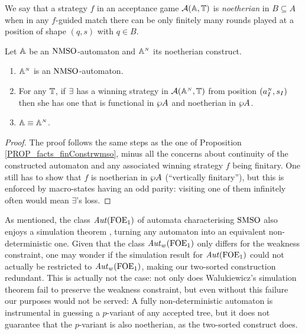 \begin{definition}\label{def:noetherianstrategy}
We say that a strategy $f$ in an acceptance game $\mathcal{A}(\mathbb{A},\mathbb{T})$ is \emph{noetherian} in $B \subseteq A$ when in any $f$-guided match there can be only finitely many rounds played at a position of shape $(q,s)$ with $q \in B$.
\end{definition}


\begin{theorem}
\label{PROP_facts_noetConstr}
Let $\mathbb{A}$ be an $\mathrm{NMSO}$-automaton and $\mathbb{A}^{{\scriptscriptstyle N}}$ its noetherian construct.
\begin{enumerate}[(1)]
   pt
  \item \label{point:finConstrAut-n}
$\mathbb{A}^{{\scriptscriptstyle N}}$ is an $\mathrm{NMSO}$-automaton.
\item 
\label{point:finConstrStrategy-n}
For any $\mathbb{T}$, if $\exists$ has a winning strategy in $\mathcal{A}(\mathbb{A}^{{\scriptscriptstyle N}},
\mathbb{T})$ from position $(a_I^{{\scriptscriptstyle N}},s_I)$ then she has one that is functional in
$\wp A$ and noetherian in $\wp A$.
\item $\mathbb{A} \equiv \mathbb{A}^{{\scriptscriptstyle N}}$. \label{point:finConstrEquiv-n}
\end{enumerate}
\end{theorem}
\begin{proof}
The proof follows the same steps as the one of 
Proposition \ref{PROP_facts_finConstrwmso}, minus all the concerns about
continuity of the constructed automaton and any associated winning strategy
$f$ being finitary. 
One still has to show that $f$ is noetherian in $\wp A$ (``vertically finitary''),
but this is enforced by macro-states having an odd parity: visiting one of them 
infinitely often would mean $\exists$'s loss.
\end{proof}

\begin{remark}
As mentioned, the class $\mathit{Aut}(\mathrm{FOE}_1)$ of automata characterising $\mathrm{SMSO}$
\cite{Jan96} also enjoys a simulation theorem \cite{Walukiewicz96}, turning any
automaton into an equivalent non-deterministic one.
Given that the class $\mathit{Aut}_{w}(\mathrm{FOE}_1)$ only differs for the weakness constraint,
one may wonder if the simulation result for $\mathit{Aut}(\mathrm{FOE}_1)$ could not actually be
restricted to $\mathit{Aut}_{w}(\mathrm{FOE}_1)$, making our two-sorted construction redundant.
This is actually not the case: not only does Walukiewicz's simulation theorem
\cite{Walukiewicz96} fail to preserve the weakness constraint, but even without
this failure our purposes would not be served:
A fully non-deterministic automaton is instrumental in guessing a $p$-variant
of any accepted tree, but it does not guarantee that the $p$-variant is also
noetherian, as the two-sorted construct does.
\end{remark}

